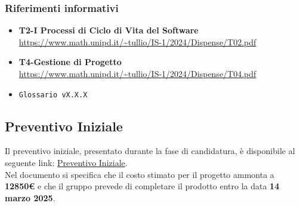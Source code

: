 \subsubsection{Riferimenti informativi}
\begin{itemize}
    \item \textbf{T2-I Processi di Ciclo di Vita del Software} \\
    \url{https://www.math.unipd.it/~tullio/IS-1/2024/Dispense/T02.pdf}
    \item \textbf{T4-Gestione di Progetto} \\
    \url{https://www.math.unipd.it/~tullio/IS-1/2024/Dispense/T04.pdf}
    \item \texttt{Glossario vX.X.X} \\
\end{itemize}
\subsection{Preventivo Iniziale}
Il preventivo iniziale, presentato durante la fase di candidatura, è disponibile al seguente link: \href{https://pebkac-swe-group-11.github.io/assets/pdf/Preventivo_Costi_Assunzione_Impegni_V2.0.0.pdf}{Preventivo Iniziale}.\\Nel documento si specifica che il costo stimato per il progetto ammonta a \textbf{12850€} e che il gruppo prevede di completare il prodotto entro la data \textbf{14 marzo 2025}.